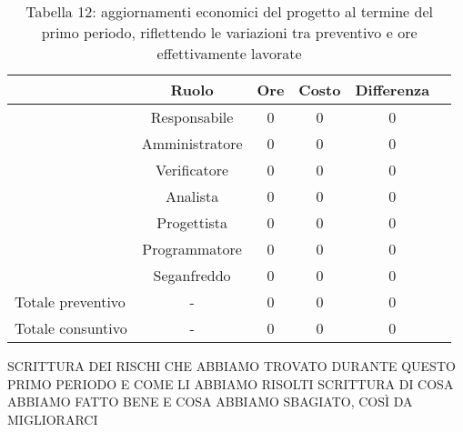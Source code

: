 \documentclass[italian,12pt]{article} %
\begin{document}
        \begin{table}[!h]
            \centering
            \begin{tabular}{ l c c c c c } 
                \hline
                \textbf{} & \textbf{Ruolo} & \textbf{Ore} & \textbf{Costo} &\textbf{Differenza} \\
                \hline  
                 & Responsabile        & 0 & 0 & 0 \\ 
                 & Amministratore      & 0 & 0 & 0 \\ 
                 & Verificatore        & 0 & 0 & 0 \\ 
                 & Analista            & 0 & 0 & 0 \\ 
                 & Progettista         & 0 & 0 & 0 \\ 
                 & Programmatore       & 0 & 0 & 0 \\ 
                 & Seganfreddo         & 0 & 0 & 0 \\
                Totale preventivo & - & 0 & 0 &0 \\
                Totale consuntivo & - & 0 & 0 & 0\\
                \hline
            \end{tabular}
            \caption{Tabella 12: aggiornamenti economici del progetto al termine del primo periodo, riflettendo le variazioni tra preventivo e ore effettivamente lavorate}
        \end{table}
        SCRITTURA DEI RISCHI CHE ABBIAMO TROVATO DURANTE QUESTO PRIMO PERIODO E COME LI ABBIAMO RISOLTI
        SCRITTURA DI COSA ABBIAMO FATTO BENE E COSA ABBIAMO SBAGIATO, COSÌ DA MIGLIORARCI
\newpage
\end{document}
